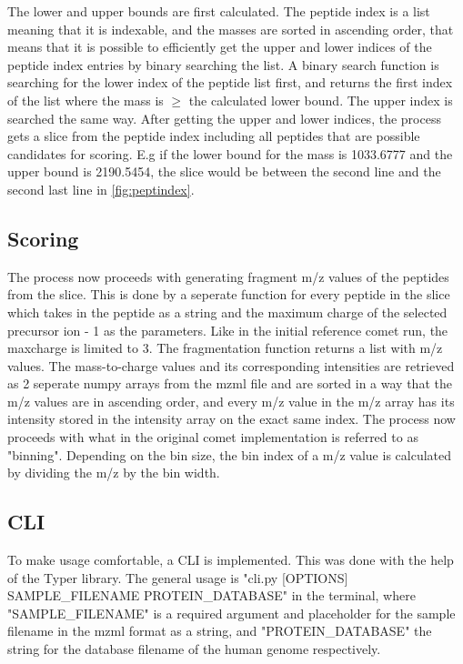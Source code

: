 \documentclass[11pt]{article}
\begin{document}
The lower and upper bounds are first calculated. The peptide index is a list meaning that it is indexable, and the masses are sorted in ascending order, that means that it is possible to efficiently get the upper and lower indices of the peptide index entries by binary searching the list. A binary search function is searching for the lower index of the peptide list first, and returns the first index of the list where the mass is $\ge$ the calculated lower bound. The upper index is searched the same way. After getting the upper and lower indices, the process gets a slice from the peptide index including all peptides that are possible candidates for scoring. E.g if the lower bound for the mass is 1033.6777 and the upper bound is 2190.5454,
the slice would be between the second line and the second last line in \cref{fig:peptindex}.

\subsection{Scoring}
The process now proceeds with generating fragment m/z values of the peptides from the slice.
This is done by a seperate function for every peptide in the slice which takes in the peptide as a string and the maximum charge of the selected precursor ion - 1 as the parameters. Like in the initial reference comet run, the maxcharge is limited to 3. The fragmentation function returns a list with m/z values.
The mass-to-charge values and its corresponding intensities are retrieved as 2 seperate numpy arrays from the mzml file and are sorted in a way that the m/z values are in ascending order, and every m/z value in the m/z array has its intensity stored in the intensity array on the exact same index.
The process now proceeds with what in the original comet implementation is referred to as "binning". Depending on the bin size, the bin index of a m/z value is calculated by dividing the m/z by the bin width.


\subsection{CLI}
To make usage comfortable, a CLI is implemented. This was done with the help of the Typer library. The general usage is "cli.py [OPTIONS] SAMPLE\_FILENAME PROTEIN\_DATABASE" in the terminal, where "SAMPLE\_FILENAME" is a required argument and placeholder for the sample filename in the mzml format as a string, and "PROTEIN\_DATABASE" the string for the database filename of the human genome respectively. 
\end{document}
